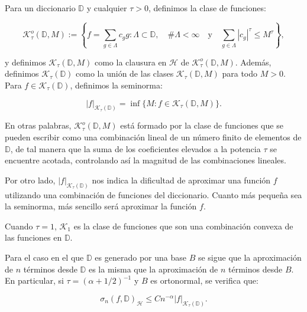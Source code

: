 \begin{definicion}
    Para un diccionario $\mathbb{D}$ y cualquier $\tau > 0$, definimos la clase de funciones:

    \[
        \mathcal{K}_{\tau}^{o}(\mathbb{D}, M) := \left\{ f = \sum_{g \in \Lambda} c_g g : \Lambda \subset \mathbb{D}, \quad \#\Lambda < \infty \quad \text{y} \quad \sum_{g \in \Lambda} |c_g|^{\tau} \leq M^{\tau} \right\},
    \]

    y definimos $\mathcal{K}_{\tau}(\mathbb{D}, M)$ como la clausura en $\mathcal{H}$ de $\mathcal{K}_{\tau}^{o}(\mathbb{D}, M)$. Además, definimos $\mathcal{K}_{\tau}(\mathbb{D})$ como la unión de las clases $\mathcal{K}_{\tau}(\mathbb{D}, M)$ para todo $M > 0$. Para $f \in \mathcal{K}_{\tau}(\mathbb{D})$, definimos la seminorma:

    \[
        |f|_{\mathcal{K}_{\tau}(\mathbb{D})} = \inf\{ M : f \in \mathcal{K}_{\tau}(\mathbb{D}, M) \}.
    \]
\end{definicion}

En otras palabras, $\mathcal{K}_{\tau}^{o}(\mathbb{D}, M)$ está formado por la clase de funciones que se pueden escribir como una combinación lineal de un número finito de elementos de $\mathbb{D}$, de tal manera que la suma de los coeficientes elevados a la potencia $\tau$ se encuentre acotada, controlando así la magnitud de las combinaciones lineales.\newline

Por otro lado, $|f|_{\mathcal{K}_{\tau}(\mathbb{D})}$ nos indica la dificultad de aproximar una función $f$ utilizando una combinación de funciones del diccionario. Cuanto más pequeña sea la seminorma, más sencillo será aproximar la función $f$.\newline

\begin{observacion}
    Cuando $\tau = 1$, $\mathcal{K}_1$ es la clase de funciones que son una combinación convexa de las funciones en $\mathbb{D}$.\newline
\end{observacion}

Para el caso en el que $\mathbb{D}$ es generado por una base $B$ se sigue que la aproximación de $n$ términos desde $\mathbb{D}$ es la misma que la aproximación de $n$ términos desde $B$. En particular, si $\tau = (\alpha + 1/2)^{-1}$ y $B$ es ortonormal, se verifica que:

\begin{equation}\label{eq:n-terms-error}
    \sigma_n(f, \mathbb{D})_{\mathcal{H}} \leq Cn^{-\alpha} |f|_{\mathcal{K}_{\tau}(\mathbb{D})}.
\end{equation}

